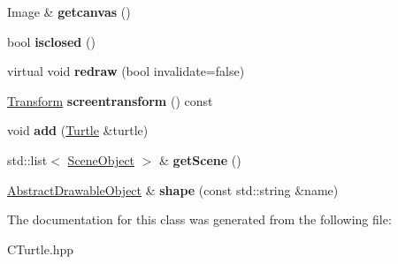 \begin{DoxyCompactItemize}
\item 
\mbox{\label{classcturtle_1_1OfflineTurtleScreen_aa1ca1c50483cbf08f1b2d18a0dd5c13f}} 
Image \& {\bfseries getcanvas} ()
\item 
\mbox{\label{classcturtle_1_1OfflineTurtleScreen_ac3b6d5bcc60a61e09644cb42783f56df}} 
bool {\bfseries isclosed} ()
\item 
\mbox{\label{classcturtle_1_1OfflineTurtleScreen_ac3991a7ef3afee19ffa1abe9044dfae5}} 
virtual void {\bfseries redraw} (bool invalidate=false)
\item 
\mbox{\label{classcturtle_1_1OfflineTurtleScreen_a277baf2cd86bc210f198ea2f51879db5}} 
\hyperlink{classcturtle_1_1Transform}{Transform} {\bfseries screentransform} () const
\item 
\mbox{\label{classcturtle_1_1OfflineTurtleScreen_a59a7b3e33ca8fab980f44d60fac7fe9e}} 
void {\bfseries add} (\hyperlink{classcturtle_1_1Turtle}{Turtle} \&turtle)
\item 
\mbox{\label{classcturtle_1_1OfflineTurtleScreen_a1488382d8f496c1d8cc28656b860a9e5}} 
std\+::list$<$ \hyperlink{structcturtle_1_1SceneObject}{Scene\+Object} $>$ \& {\bfseries get\+Scene} ()
\item 
\mbox{\label{classcturtle_1_1OfflineTurtleScreen_af490af40f66a892807c2f7ea762d9bd0}} 
\hyperlink{classcturtle_1_1AbstractDrawableObject}{Abstract\+Drawable\+Object} \& {\bfseries shape} (const std\+::string \&name)
\end{DoxyCompactItemize}


The documentation for this class was generated from the following file\+:\begin{DoxyCompactItemize}
\item 
C\+Turtle.\+hpp\end{DoxyCompactItemize}
